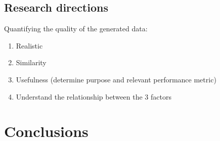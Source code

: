 \documentclass[parskip=full]{scrartcl}
\begin{document}
\subsection{Research directions}


Quantifying the quality of the generated data:

\begin{enumerate}
    \item Realistic
    \item Similarity
    \item Usefulness (determine purpose and relevant performance metric)
    \item Understand the relationship between the 3 factors
\end{enumerate}

\section{Conclusions}~\label{sec:conclusions}

\printbibliography
\end{document}
